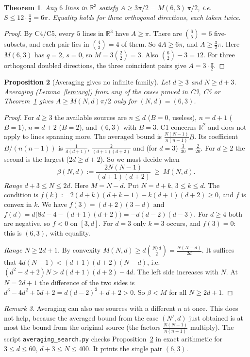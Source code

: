 \documentclass[11pt]{article}
\newtheorem{theorem}{Theorem}
\newtheorem{proposition}[theorem]{Proposition}
\theoremstyle{remark}
\newtheorem{remark}[theorem]{Remark}
\begin{document}
\begin{theorem}\label{thm:63}
Any $6$ lines in $\mathbb R^3$ satisfy $A\ge3\pi/2=M(6,3)\,\pi/2$, i.e.\ $S\le12\cdot\frac\pi2=6\pi$.
Equality holds for three orthogonal directions, each taken twice.
\end{theorem}
\begin{proof}
By C4/C5, every $5$ lines in $\mathbb R^3$ have $A\ge\pi$. There are $\binom65=6$ five-subsets, and each
pair lies in $\binom43=4$ of them. So $4A\ge6\pi$, and $A\ge\frac32\pi$. Here $M(6,3)$ has $q=2$, $s=0$,
so $M=3\binom22=3$. Also $\binom62-3=12$. For three orthogonal doubled directions, the three
coincident pairs give $A=3\cdot\frac\pi2$.
\end{proof}

\begin{proposition}[Averaging gives no infinite family]\label{prop:avg}
Let $d\ge3$ and $N\ge d+3$. Averaging (Lemma~\ref{lem:avg}) from any of the cases proved in
\textup{C3}, \textup{C5} or Theorem~\ref{thm:63} gives $A\ge M(N,d)\pi/2$ only for $(N,d)=(6,3)$.
\end{proposition}
\begin{proof}
For $d\ge3$ the available sources are $n\le d$ ($B=0$, useless), $n=d+1$ ($B=1$), $n=d+2$ ($B=2$),
and $(6,3)$ with $B=3$. C1 concerns $\mathbb R^2$ and does not apply to lines spanning more. The
averaged bound is $\frac{N(N-1)}{n(n-1)}B$. Its coefficient $B/(n(n-1))$ is
$\frac1{d(d+1)}$, $\frac2{(d+1)(d+2)}$ and (for $d=3$) $\frac3{30}=\frac2{20}$. For $d\ge2$ the second
is the largest ($2d\ge d+2$). So we must decide when
\[
\beta(N,d):=\frac{2N(N-1)}{(d+1)(d+2)}\ \ge\ M(N,d).
\]
\emph{Range $d+3\le N\le2d$.} Here $M=N-d$. Put $N=d+k$, $3\le k\le d$. The condition is
$f(k):=2(d+k)(d+k-1)-k(d+1)(d+2)\ge0$, and $f$ is convex in $k$. We have
$f(3)=(d+2)(3-d)$ and $f(d)=d\bigl(8d-4-(d+1)(d+2)\bigr)=-d(d-2)(d-3)$. For $d\ge4$ both are
negative, so $f<0$ on $[3,d]$. For $d=3$ only $k=3$ occurs, and $f(3)=0$: this is $(6,3)$, with
equality.

\emph{Range $N\ge2d+1$.} By convexity $M(N,d)\ge d\binom{N/d}2=\frac{N(N-d)}{2d}$. It suffices that
$4d(N-1)<(d+1)(d+2)(N-d)$, i.e.\ $(d^2-d+2)N>d(d+1)(d+2)-4d$. The left side increases with $N$. At
$N=2d+1$ the difference of the two sides is $d^3-4d^2+5d+2=d(d-2)^2+d+2>0$. So $\beta<M$ for all
$N\ge2d+1$.
\end{proof}

\begin{remark}
Averaging can also use sources with a different $n$ at once. This does not help, because the averaged
bound from the case $(N',d)$ just obtained is at most the bound from the original source (the factors
$\frac{N(N-1)}{n(n-1)}$ multiply). The script \texttt{averaging\_search.py} checks
Proposition~\ref{prop:avg} in exact arithmetic for $3\le d\le60$, $d+3\le N\le400$. It prints the
single pair $(6,3)$.
\end{remark}
\end{document}
